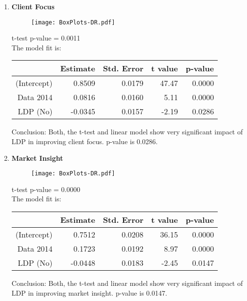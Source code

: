 \documentclass[11pt]{extarticle} %
\begin{document}
\begin{enumerate}
\item {\bf{Client Focus}}\\
\begin{minipage}[t]{0.3\textwidth}
\begin{figure}[H]
\centering 
\texttt{[image: BoxPlots-DR.pdf]}
\end{figure}
\end{minipage}
\begin{minipage}[t]{0.6\textwidth}
\vspace{0.8cm}
t-test p-value = 0.0011 \\
The model fit is:
\begin{table}[H]
\centering
\begin{tabular}{rrrrr}
  \hline
 & Estimate & Std. Error & t value & p-value \\ 
  \hline
(Intercept) & 0.8509 & 0.0179 & 47.47 & 0.0000 \\ 
  Data 2014 & 0.0816 & 0.0160 & 5.11 & 0.0000 \\ 
  LDP (No) & -0.0345 & 0.0157 & -2.19 & 0.0286 \\ 
   \hline
\end{tabular}
\end{table}
Conclusion: Both, the t-test and linear model show very significant impact of LDP in improving client focus. p-value is 0.0286. 
\end{minipage}

\item {\bf{Market Insight}}\\
\begin{minipage}[t]{0.3\textwidth}
\begin{figure}[H]
\centering 
\texttt{[image: BoxPlots-DR.pdf]}
\end{figure}
\end{minipage}
\begin{minipage}[t]{0.6\textwidth}
\vspace{0.8cm}
t-test p-value = 0.0000 \\
The model fit is:
\begin{table}[H]
\centering
\begin{tabular}{rrrrr}
  \hline
 & Estimate & Std. Error & t value & p-value \\ 
  \hline
(Intercept) & 0.7512 & 0.0208 & 36.15 & 0.0000 \\ 
  Data 2014 & 0.1723 & 0.0192 & 8.97 & 0.0000 \\ 
  LDP (No) & -0.0448 & 0.0183 & -2.45 & 0.0147 \\ 
   \hline
\end{tabular}
\end{table}
Conclusion: Both, the t-test and linear model show very significant impact of LDP in improving market insight. p-value is 0.0147. 
\end{minipage}


\end{enumerate}
\end{document}
